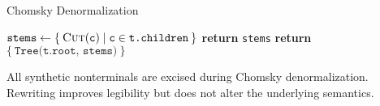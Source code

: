 \documentclass{beamer}
\begin{document}
\begin{frame}[fragile]{Chomsky Denormalization}
{\begin{minipage}[l]{10cm}
      \begin{algorithm}[H]
        \caption{Rewrite procedure for tree denormalization}\label{alg:cap}
        \begin{algorithmic}
            \State $\texttt{stems} \leftarrow \{\:\textsc{Cut}(\texttt{c}) \mid \texttt{c} \in \texttt{t.children}\:\}$
              \State \textbf{return } \texttt{stems} %
            \Else%
              \State \textbf{return } $\{\:\texttt{Tree(t.root, stems)}\:\}$
            \EndIf
          \EndProcedure
        \end{algorithmic}
      \end{algorithm}
    \end{minipage}
  }

  \vspace{1cm}All synthetic nonterminals are excised during Chomsky denormalization. Rewriting improves legibility but does not alter the underlying semantics.
\end{frame}
\end{document}
